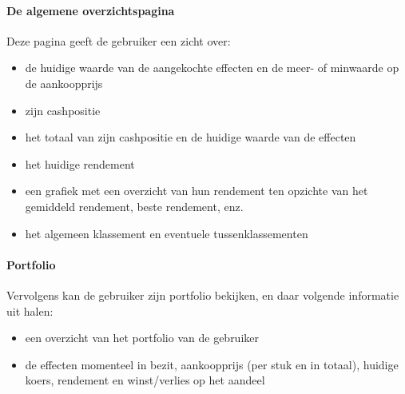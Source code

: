 \paragraph{De algemene overzichtspagina}
Deze pagina geeft de gebruiker een zicht over:
\begin{itemize}
	\item{de huidige waarde van de aangekochte effecten en de meer- of minwaarde op de aankoopprijs}
	\item{zijn cashpositie}
	\item{het totaal van zijn cashpositie en de huidige waarde van de effecten}
	\item{het huidige rendement}
	\item{een grafiek met een overzicht van hun rendement ten opzichte van het gemiddeld rendement, beste rendement, enz.}
	\item{het algemeen klassement en eventuele tussenklassementen}
\end{itemize}

\paragraph{Portfolio}
Vervolgens kan de gebruiker zijn portfolio bekijken, en daar volgende informatie uit halen:
\begin{itemize}
	\item{een overzicht van het portfolio van de gebruiker}
	\item{de effecten momenteel in bezit, aankoopprijs (per stuk en in totaal), huidige koers, rendement en winst/verlies op het aandeel}
\end{itemize}

